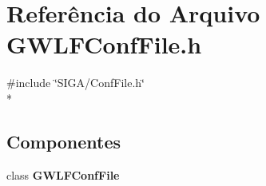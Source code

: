 \section{Referência do Arquivo G\+W\+L\+F\+Conf\+File.\+h}
\label{_g_w_l_f_conf_file_8h}
{\ttfamily \#include \char`\"{}S\+I\+G\+A/\+Conf\+File.\+h\char`\"{}}\\*
\subsection*{Componentes}
\begin{DoxyCompactItemize}
\item 
class {\bf G\+W\+L\+F\+Conf\+File}
\end{DoxyCompactItemize}
